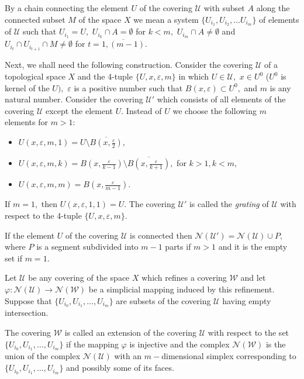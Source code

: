 \begin{dfn}
By a {\rm chain connecting the element} $U$ of the covering
$\mathcal{U}$ with subset $A$ along the connected subset $M$ of
the space $X$ we mean a system $\{U_{i_1}, U_{i_2},\dots
U_{i_m}\}$ of elements of $\mathcal{U}$ such that $U_{i_1} = U,$
$U_{i_k}\cap A = \emptyset$ for $k < m,$ $U_{i_m}\cap A \neq
\emptyset$  and $U_{i_t}\cap U_{i_{t+1}}\cap M \neq \emptyset$ for
$t = \overline{1, (m-1)}.$
\end{dfn}

Next,
we shall
need the following construction. Consider the covering
$\mathcal{U}$ of a topological space $X$ and the 4-tuple $\{U, x,
\varepsilon, m\}$ in which $U\in \mathcal{U},$ $x\in U^0$ ($U^0$
is kernel of the $U),$ $\varepsilon$ is a positive number such
that $B(x, \varepsilon) \subset U^0,$ and $m$ is any natural
number. Consider the covering $\mathcal{U}'$ which consists of all
elements of the covering $\mathcal{U}$ except the element $U.$
Instead of $U$ we choose the following $m$ elements for $m>1$:
\begin{itemize}
    \item $U(x, \varepsilon, m, 1) = U\setminus \overline{B(x, \frac{\varepsilon}{2})}$,
    \item $U(x, \varepsilon, m, k) = B(x, \frac{\varepsilon}{k-1})\setminus \overline{B(x,
    \frac{\varepsilon}{k+1})},$ for $k > 1, k < m,$
    \item $U(x, \varepsilon, m, m) = B(x,
    \frac{\varepsilon}{m-1}).$
\end{itemize}
If $m = 1,$ then $U(x, \varepsilon, 1, 1) = U.$ The covering
$\mathcal{U}'$ is called the {\it grating} of $\mathcal{U}$ with
respect to the 4-tuple $\{U, x, \varepsilon, m\}.$

If the element $U$ of the covering $\mathcal{U}$ is connected then
$\mathcal{N}(\mathcal{U}') = \mathcal{N}(\mathcal{U})\cup P,$
where $P$ is a segment subdivided into $m-1$ parts if $m>1$ and it
is the empty set if $m=1.$

Let $\mathcal{U}$ be any covering of the space $X$ which refines a
covering $\mathcal{W}$ and let $\varphi : \mathcal{N}(\mathcal{U})
\to \mathcal{N}(\mathcal{W})$ be a simplicial mapping induced by
this refinement. Suppose that $\{U_{i_0}, U_{i_1},\dots,
U_{i_m}\}$ are subsets of the covering $\mathcal{U}$ having empty
intersection.

\begin{dfn}\label{dfn:extension}
The covering $\mathcal{W}$ is called an {\rm extension} of the
covering $\mathcal{U}$ with respect to the set $\{U_{i_0},
U_{i_1},\dots, U_{i_m}\}$ if the mapping $\varphi$ is injective
and the complex $\mathcal{N}(\mathcal{W})$ is the union of the
complex $\mathcal{N}(\mathcal{U})$ with an $m-$dimensional simplex
corresponding to $\{U_{i_0},U_{i_1},\dots, U_{i_m}\}$ and possibly
some of its faces.
\end{dfn}

